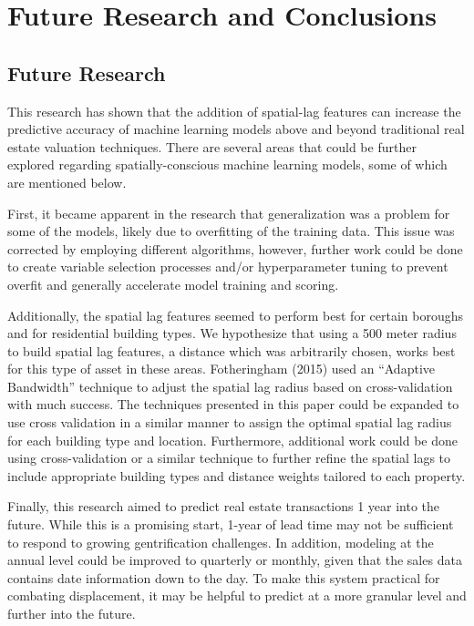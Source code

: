 \documentclass[12pt,]{article}
\begin{document}
\hypertarget{future-research-and-conclusions}{%
\section{Future Research and
Conclusions}\label{future-research-and-conclusions}}

\hypertarget{future-research}{%
\subsection{Future Research}\label{future-research}}

This research has shown that the addition of spatial-lag features can
increase the predictive accuracy of machine learning models above and
beyond traditional real estate valuation techniques. There are several
areas that could be further explored regarding spatially-conscious
machine learning models, some of which are mentioned below.

First, it became apparent in the research that generalization was a
problem for some of the models, likely due to overfitting of the
training data. This issue was corrected by employing different
algorithms, however, further work could be done to create variable
selection processes and/or hyperparameter tuning to prevent overfit and
generally accelerate model training and scoring.

Additionally, the spatial lag features seemed to perform best for
certain boroughs and for residential building types. We hypothesize that
using a 500 meter radius to build spatial lag features, a distance which
was arbitrarily chosen, works best for this type of asset in these
areas. Fotheringham (2015) used an ``Adaptive Bandwidth'' technique to
adjust the spatial lag radius based on cross-validation with much
success. The techniques presented in this paper could be expanded to use
cross validation in a similar manner to assign the optimal spatial lag
radius for each building type and location. Furthermore, additional work
could be done using cross-validation or a similar technique to further
refine the spatial lags to include appropriate building types and
distance weights tailored to each property.

Finally, this research aimed to predict real estate transactions 1 year
into the future. While this is a promising start, 1-year of lead time
may not be sufficient to respond to growing gentrification challenges.
In addition, modeling at the annual level could be improved to quarterly
or monthly, given that the sales data contains date information down to
the day. To make this system practical for combating displacement, it
may be helpful to predict at a more granular level and further into the
future.
\end{document}
